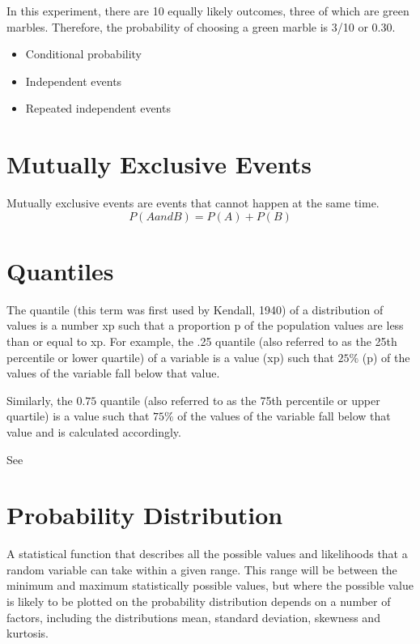 \documentclass[12pt]{report}
\begin{document}
In this experiment, there are 10 equally likely outcomes, three of which are green marbles. Therefore, the probability of choosing a green marble is 3/10 or 0.30.

\begin{itemize}
	\item Conditional probability
	\item Independent events
	\item Repeated independent events
\end{itemize}


\section{Mutually Exclusive Events}
Mutually exclusive events are events that cannot happen at the same time.
\[ P(A and B) = P(A) + P(B) \]

\section{Quantiles}

The quantile (this term was first used by Kendall, 1940) of a distribution of values is a number xp such that a proportion p of the population values are less than or equal to xp. For example, the .25 quantile (also referred to as the 25th percentile or lower quartile) of a variable is a value (xp) such that $25\%$ (p) of the values of the variable fall below that value.

Similarly, the $0.75$ quantile (also referred to as the 75th percentile or upper quartile) is a value such that $75\%$ of the values of the variable fall below that value and is calculated accordingly.

See



\section{Probability Distribution}

A statistical function that describes all the possible values and likelihoods that a random variable can take within a given range. This range will be between the minimum and maximum statistically possible values, but where the possible value is likely to be plotted on the probability distribution depends on a number of factors, including the distributions mean, standard deviation, skewness and kurtosis.
\end{document}
